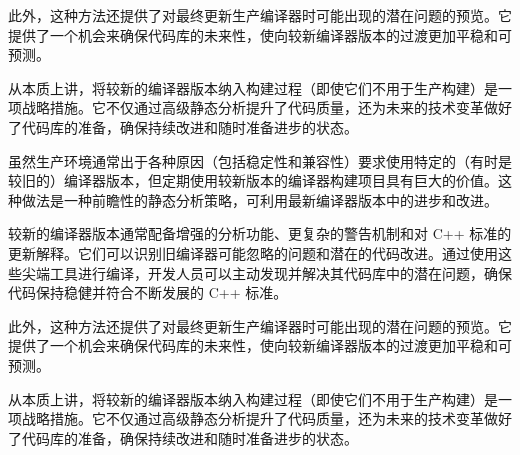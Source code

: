此外，这种方法还提供了对最终更新生产编译器时可能出现的潜在问题的预览。它提供了一个机会来确保代码库的未来性，使向较新编译器版本的过渡更加平稳和可预测。

从本质上讲，将较新的编译器版本纳入构建过程（即使它们不用于生产构建）是一项战略措施。它不仅通过高级静态分析提升了代码质量，还为未来的技术变革做好了代码库的准备，确保持续改进和随时准备进步的状态。


虽然生产环境通常出于各种原因（包括稳定性和兼容性）要求使用特定的（有时是较旧的）编译器版本，但定期使用较新版本的编译器构建项目具有巨大的价值。这种做法是一种前瞻性的静态分析策略，可利用最新编译器版本中的进步和改进。

较新的编译器版本通常配备增强的分析功能、更复杂的警告机制和对 C++ 标准的更新解释。它们可以识别旧编译器可能忽略的问题和潜在的代码改进。通过使用这些尖端工具进行编译，开发人员可以主动发现并解决其代码库中的潜在问题，确保代码保持稳健并符合不断发展的 C++ 标准。

此外，这种方法还提供了对最终更新生产编译器时可能出现的潜在问题的预览。它提供了一个机会来确保代码库的未来性，使向较新编译器版本的过渡更加平稳和可预测。

从本质上讲，将较新的编译器版本纳入构建过程（即使它们不用于生产构建）是一项战略措施。它不仅通过高级静态分析提升了代码质量，还为未来的技术变革做好了代码库的准备，确保持续改进和随时准备进步的状态。


















